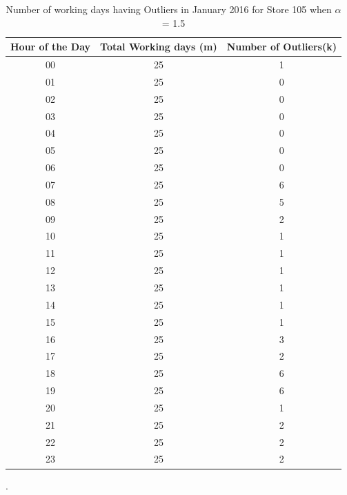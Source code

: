 \documentclass[12pt]{article}
\begin{document}
\begin{table}[H]
	\centering
	{\renewcommand{\arraystretch}{1.0} 
		\begin{tabular}{|c|c|c|}
			\hline %
			Hour of the Day & Total Working days (m) & Number of Outliers(k)\\
			\hline	%
			00 & 25 &1
			\\ \hline  %
			01 & 25 & 0 \\ \hline %
			02 & 25 & 0\\  \hline  %
			03 & 25 &0\\ 
			\hline	%
			04 & 25 & 0 \\ \hline  %
			05 & 25 & 0 \\ \hline %
			06 & 25 & 0\\  \hline  %
			07 & 25 &6 \\ 
			\hline	%
			08 & 25 &5 \\ 
			\hline	%
			09 & 25 & 2 \\ \hline  %
			10 &25 & 1\\ \hline %
			11 & 25 &1 \\  \hline  %
			12 & 25 &1 \\ 
			\hline	%
			13 &25 & 1 \\ \hline %
			14 & 25 &1 \\  \hline  %
			15 & 25 &1\\ 
			\hline	%
			16 &25 & 3 \\ \hline %
			17 & 25 & 2\\  \hline  %
			18 & 25 &6 \\ \hline
			19 & 25 & 6 \\ \hline %
			20 & 25  & 1\\  \hline  %
			21 & 25 &2 \\ 
			\hline	%
			22 &25 & 2 \\ \hline %
			23 & 25 & 2\\  \hline  %
		\end{tabular}
	}
	\caption{Number of working days having Outliers in January 2016 for Store 105 when $\alpha$ = 1.5}.
	\label{table:studies3}
\end{table}
\end{document}
